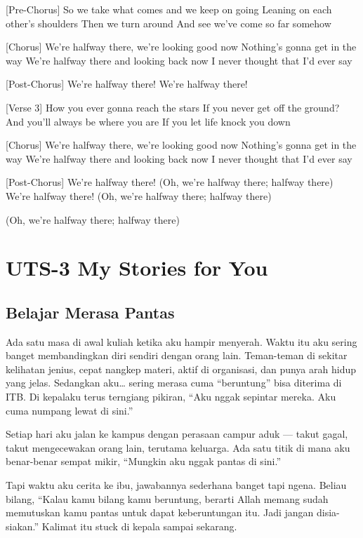 \documentclass[
  letterpaper,
  DIV=11,
  numbers=noendperiod]{scrreprt}
\begin{document}
{[}Pre-Chorus{]} So we take what comes and we keep on going Leaning on
each other's shoulders Then we turn around And see we've come so far
somehow

{[}Chorus{]} We're halfway there, we're looking good now Nothing's gonna
get in the way We're halfway there and looking back now I never thought
that I'd ever say

{[}Post-Chorus{]} We're halfway there! We're halfway there!

{[}Verse 3{]} How you ever gonna reach the stars If you never get off
the ground? And you'll always be where you are If you let life knock you
down

{[}Chorus{]} We're halfway there, we're looking good now Nothing's gonna
get in the way We're halfway there and looking back now I never thought
that I'd ever say

{[}Post-Chorus{]} We're halfway there! (Oh, we're halfway there; halfway
there) We're halfway there! (Oh, we're halfway there; halfway there)

(Oh, we're halfway there; halfway there)


\chapter{UTS-3 My Stories for You}\label{uts-3-my-stories-for-you}

\section{Belajar Merasa Pantas}\label{belajar-merasa-pantas}

Ada satu masa di awal kuliah ketika aku hampir menyerah. Waktu itu aku
sering banget membandingkan diri sendiri dengan orang lain. Teman-teman
di sekitar kelihatan jenius, cepat nangkep materi, aktif di organisasi,
dan punya arah hidup yang jelas. Sedangkan aku\ldots{} sering merasa
cuma ``beruntung'' bisa diterima di ITB. Di kepalaku terus terngiang
pikiran, ``Aku nggak sepintar mereka. Aku cuma numpang lewat di sini.''

Setiap hari aku jalan ke kampus dengan perasaan campur aduk --- takut
gagal, takut mengecewakan orang lain, terutama keluarga. Ada satu titik
di mana aku benar-benar sempat mikir, ``Mungkin aku nggak pantas di
sini.''

Tapi waktu aku cerita ke ibu, jawabannya sederhana banget tapi ngena.
Beliau bilang, ``Kalau kamu bilang kamu beruntung, berarti Allah memang
sudah memutuskan kamu pantas untuk dapat keberuntungan itu. Jadi jangan
disia-siakan.'' Kalimat itu stuck di kepala sampai sekarang.
\end{document}
